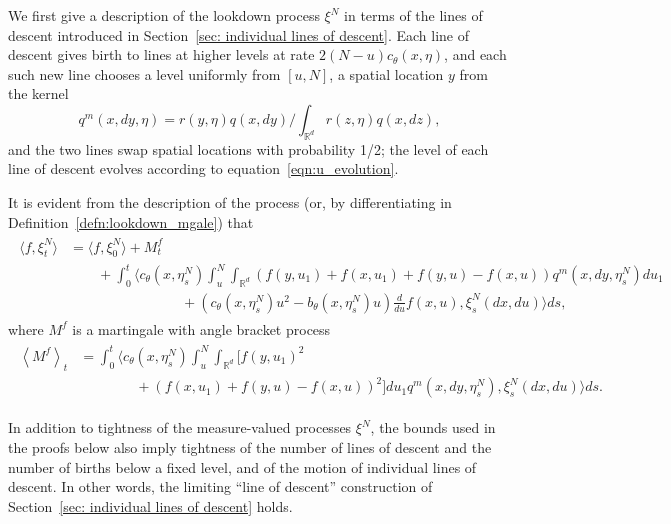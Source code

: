 \documentclass[EJP]{ejpecp} %
\newcommand{\IR}{\mathbb R}
\newcommand{\lp}{\xi}              %
\begin{document}
We first give a description of the lookdown process $\lp^N$ in terms of the lines of descent
introduced in Section~\ref{sec: individual lines of descent}.
Each line of descent
gives birth to lines at higher levels at rate $2 (N - u) c_\theta(x, \eta)$,
and each such new line chooses a level uniformly from $[u, N]$,
a spatial location $y$ from the kernel
\begin{equation} \label{eqn:qm_defn}
    q^m(x, dy, \eta)
    =
    r(y, \eta) q(x, dy) / \int_{\IR^d} r(z, \eta) q(x, dz),
\end{equation}
and the two lines swap spatial locations with probability 1/2;
the level of each line of descent evolves according to equation~\eqref{eqn:u_evolution}.

It is evident from the description of the process
(or, by differentiating in Definition~\ref{defn:lookdown_mgale})
that
\begin{align} \label{eqn:f_xi_mgale}
\begin{split}
    \langle f, \lp_t^N \rangle
    &=
    \langle f, \lp_0^N \rangle
    + M^f_t
\\ & \qquad {}
    +
    \int_0^t
    \bigg\langle
        c_\theta(x, \eta^N_s)
        \int_u^N \int_{\IR^d}
        \left(
            f(y, u_1) + f(x, u_1) + f(y, u) - f(x, u)
        \right)
        q^m(x, dy, \eta^N_s) du_1 
\\ & \qquad \qquad \qquad \qquad {}
        +
        \left(
            c_\theta(x, \eta^N_s) u^2
            - b_\theta(x, \eta^N_s) u
        \right)
        \frac{d}{du} f(x, u)
    ,
    \lp_s^N(dx, du) \bigg \rangle
    ds ,
\end{split}
\end{align}
where $M^f$ is a martingale
with angle bracket process
\begin{align} \label{eqn:f_xi_qv}
    \begin{split}
    \left\langle M^f \right\rangle_t
    &=
    \int_0^t
    \bigg \langle c_\theta(x, \eta_s^N) \int_u^N \int_{\IR^d}
        \big[ f(y, u_1)^2
\\&\qquad \qquad {}
        + \left( f(x, u_1) + f(y, u) - f(x, u) \right)^2 \big]
    du_1 q^m(x, dy, \eta^N_s)
    ,
    \lp_s^N(dx, du) \bigg \rangle
    ds .
\end{split}\end{align}

\begin{remark}
In addition to tightness of the measure-valued processes $\lp^N$, 
the bounds used in the proofs below also imply
tightness of the number of lines of descent and the number of births below a fixed level,
and of the motion of individual lines of descent.
In other words, the limiting ``line of descent'' construction
of Section~\ref{sec: individual lines of descent} holds.
\end{remark}
\end{document}
